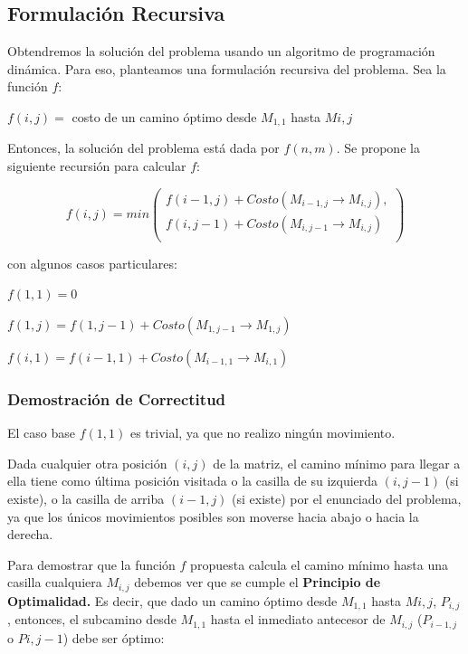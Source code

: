 \newpage

\subsection{Formulación Recursiva}

Obtendremos la solución del problema usando un algoritmo de programación dinámica. Para eso, planteamos una formulación recursiva del problema. Sea la función $f$:

$f(i,j) = $ costo de un camino óptimo desde $ M_{1,1} $ hasta $ M{i,j}$

Entonces, la solución del problema está dada por $f(n,m)$. 
Se propone la siguiente recursión para calcular $f$:

\begin{equation} \label{formulacionRecursiva}
f(i,j) = min \left( 
	\begin{array}{lr}
    f(i-1, j) + Costo(M_{i-1,j} \rightarrow M_{i,j}), \\
	f(i,j-1) + Costo(M_{i,j-1} \rightarrow M_{i,j}) \\
     \end{array}
   \right)
\end{equation}  

con algunos casos particulares:

$f(1,1) = 0 $

$f(1,j) = f(1,j-1) + Costo(M_{1,j-1} \rightarrow M_{1,j})$

$f(i,1) = f(i-1,1) + Costo(M_{i-1,1} \rightarrow M_{i,1})$

\subsubsection{Demostración de Correctitud}

El caso base $f(1,1)$ es trivial, ya que no realizo ningún movimiento.

Dada cualquier otra posición $(i,j)$ de la matriz, el camino mínimo para llegar a ella tiene como última posición visitada o la casilla de su izquierda $(i, j-1)$ (si existe), o la casilla de arriba $(i-1, j)$ (si existe) por el enunciado del problema, ya que los únicos movimientos posibles son moverse hacia abajo o hacia la derecha.

Para demostrar que la función $f$ propuesta calcula el camino mínimo hasta una casilla cualquiera $M_{i,j}$ debemos ver que se cumple el \textbf{Principio de Optimalidad.} Es decir, que dado un camino óptimo desde $M_{1,1}$ hasta $M{i,j}$, $P_{i,j}$, entonces, el subcamino desde $M_{1,1}$ hasta el inmediato antecesor de $M_{i,j}$ ($P_{i-1,j}$ o $P{i,j-1}$) debe ser óptimo: 

